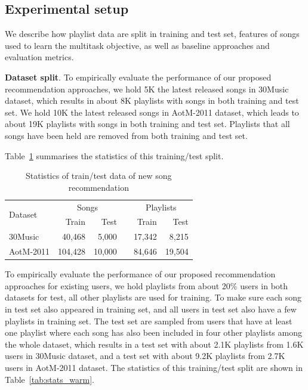 
\subsection{Experimental setup}
We describe how playlist data are split in training and test set,
features of songs used to learn the multitask objective, as well as
baseline approaches and evaluation metrics.

{\bf Dataset split}.
To empirically evaluate the performance of our proposed recommendation approaches,
we hold 5K the latest released songs in 30Music dataset, which results in about 8K playlists with songs
in both training and test set.
We hold 10K the latest released songs in AotM-2011 dataset, which leads to about 19K playlists with songs
in both training and test set.
Playlists that all songs have been held are removed from both training and test set.

Table~\ref{tab:stats_nsr} summarises the statistics of this training/test split.

\begin{table}[!h]
\centering
\caption{Statistics of train/test data of new song recommendation}
\label{tab:stats_nsr}
\begin{tabular}{lrrcrr}
\toprule
\multirow{2}{*}{Dataset}  & \multicolumn{2}{c}{Songs} && \multicolumn{2}{c}{Playlists} \\ \cmidrule{2-3} \cmidrule{5-6}
                          & Train & Test && Train & Test \\
\midrule
30Music   & 40,468  & 5,000  && 17,342  & 8,215 \\
AotM-2011 & 104,428 & 10,000 && 84,646  & 19,504 \\
\bottomrule
\end{tabular}
\end{table}


To empirically evaluate the performance of our proposed recommendation approaches for existing users,
we hold playlists from about 20\% users in both datasets for test,
all other playlists are used for training.
To make sure each song in test set also appeared in training set,
and all users in test set also have a few playlists in training set.
The test set are sampled from users that have at least one playlist where each song has also been
included in four other playlists among the whole dataset,
which results in a test set with about 2.1K playlists from 1.6K users in 30Music dataset,
and a test set with about 9.2K playlists from 2.7K users in AotM-2011 dataset.
The statistics of this training/test split are shown in Table~\ref{tab:stats_warm}.

